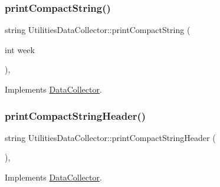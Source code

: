 \mbox{\label{classUtilitiesDataCollector_a57b5f9cd8ddf54154476749ab0977355_a57b5f9cd8ddf54154476749ab0977355}} 
\subsubsection{\texorpdfstring{print\+Compact\+String()}{printCompactString()}}
{\footnotesize\ttfamily string Utilities\+Data\+Collector\+::print\+Compact\+String (\begin{DoxyParamCaption}\item[{int}]{week }\end{DoxyParamCaption})\hspace{0.3cm}{\ttfamily [override]}, {\ttfamily [virtual]}}



Implements \mbox{\hyperlink{classDataCollector_a2eac264fa5612aed5a830b12de4f4ae3_a2eac264fa5612aed5a830b12de4f4ae3}{Data\+Collector}}.

\mbox{\label{classUtilitiesDataCollector_ab3409c407783fd4451f310d2fc177b22_ab3409c407783fd4451f310d2fc177b22}} 
\subsubsection{\texorpdfstring{print\+Compact\+String\+Header()}{printCompactStringHeader()}}
{\footnotesize\ttfamily string Utilities\+Data\+Collector\+::print\+Compact\+String\+Header (\begin{DoxyParamCaption}{ }\end{DoxyParamCaption})\hspace{0.3cm}{\ttfamily [override]}, {\ttfamily [virtual]}}



Implements \mbox{\hyperlink{classDataCollector_a98dcb4ec871d9c7fbf7545c64e5ccc67_a98dcb4ec871d9c7fbf7545c64e5ccc67}{Data\+Collector}}.

